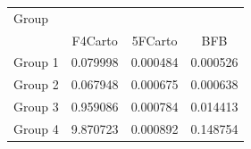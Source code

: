 \begin{tabular}{lccc}
\toprule
Group &  \\
\cmidrule(lr){2-4}
     & F4Carto & 5FCarto & BFB \\
\midrule

Group 1 & 0.079998 & 0.000484 & 0.000526 \\
Group 2 & 0.067948 & 0.000675 & 0.000638 \\
Group 3 & 0.959086 & 0.000784 & 0.014413 \\
Group 4 & 9.870723 & 0.000892 & 0.148754 \\
\bottomrule
\end{tabular}
